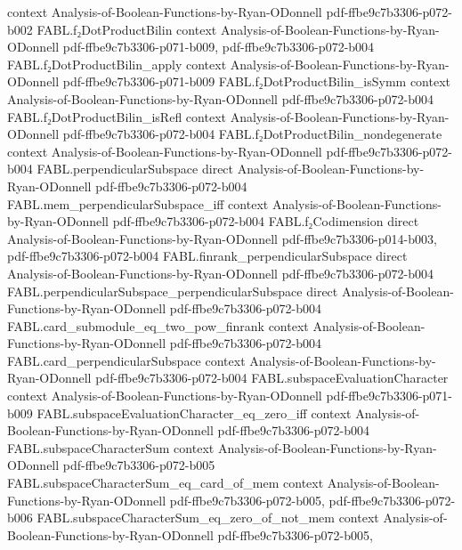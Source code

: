 \begin{theorem}
  {context}
  {Analysis-of-Boolean-Functions-by-Ryan-ODonnell}
  {pdf-ffbe9c7b3306-p072-b002}
\proofstep
  {FABL.f₂DotProductBilin}
  {context}
  {Analysis-of-Boolean-Functions-by-Ryan-ODonnell}
  {pdf-ffbe9c7b3306-p071-b009,
    pdf-ffbe9c7b3306-p072-b004}
\proofstep
  {FABL.f₂DotProductBilin_apply}
  {context}
  {Analysis-of-Boolean-Functions-by-Ryan-ODonnell}
  {pdf-ffbe9c7b3306-p071-b009}
\proofstep
  {FABL.f₂DotProductBilin_isSymm}
  {context}
  {Analysis-of-Boolean-Functions-by-Ryan-ODonnell}
  {pdf-ffbe9c7b3306-p072-b004}
\proofstep
  {FABL.f₂DotProductBilin_isRefl}
  {context}
  {Analysis-of-Boolean-Functions-by-Ryan-ODonnell}
  {pdf-ffbe9c7b3306-p072-b004}
\proofstep
  {FABL.f₂DotProductBilin_nondegenerate}
  {context}
  {Analysis-of-Boolean-Functions-by-Ryan-ODonnell}
  {pdf-ffbe9c7b3306-p072-b004}
\proofstep
  {FABL.perpendicularSubspace}
  {direct}
  {Analysis-of-Boolean-Functions-by-Ryan-ODonnell}
  {pdf-ffbe9c7b3306-p072-b004}
\proofstep
  {FABL.mem_perpendicularSubspace_iff}
  {context}
  {Analysis-of-Boolean-Functions-by-Ryan-ODonnell}
  {pdf-ffbe9c7b3306-p072-b004}
\proofstep
  {FABL.f₂Codimension}
  {direct}
  {Analysis-of-Boolean-Functions-by-Ryan-ODonnell}
  {pdf-ffbe9c7b3306-p014-b003,
    pdf-ffbe9c7b3306-p072-b004}
\proofstep
  {FABL.finrank_perpendicularSubspace}
  {direct}
  {Analysis-of-Boolean-Functions-by-Ryan-ODonnell}
  {pdf-ffbe9c7b3306-p072-b004}
\proofstep
  {FABL.perpendicularSubspace_perpendicularSubspace}
  {direct}
  {Analysis-of-Boolean-Functions-by-Ryan-ODonnell}
  {pdf-ffbe9c7b3306-p072-b004}
\proofstep
  {FABL.card_submodule_eq_two_pow_finrank}
  {context}
  {Analysis-of-Boolean-Functions-by-Ryan-ODonnell}
  {pdf-ffbe9c7b3306-p072-b004}
\proofstep
  {FABL.card_perpendicularSubspace}
  {context}
  {Analysis-of-Boolean-Functions-by-Ryan-ODonnell}
  {pdf-ffbe9c7b3306-p072-b004}
\proofstep
  {FABL.subspaceEvaluationCharacter}
  {context}
  {Analysis-of-Boolean-Functions-by-Ryan-ODonnell}
  {pdf-ffbe9c7b3306-p071-b009}
\proofstep
  {FABL.subspaceEvaluationCharacter_eq_zero_iff}
  {context}
  {Analysis-of-Boolean-Functions-by-Ryan-ODonnell}
  {pdf-ffbe9c7b3306-p072-b004}
\proofstep
  {FABL.subspaceCharacterSum}
  {context}
  {Analysis-of-Boolean-Functions-by-Ryan-ODonnell}
  {pdf-ffbe9c7b3306-p072-b005}
\proofstep
  {FABL.subspaceCharacterSum_eq_card_of_mem}
  {context}
  {Analysis-of-Boolean-Functions-by-Ryan-ODonnell}
  {pdf-ffbe9c7b3306-p072-b005,
    pdf-ffbe9c7b3306-p072-b006}
\proofstep
  {FABL.subspaceCharacterSum_eq_zero_of_not_mem}
  {context}
  {Analysis-of-Boolean-Functions-by-Ryan-ODonnell}
  {pdf-ffbe9c7b3306-p072-b005,
}
\end{theorem}
